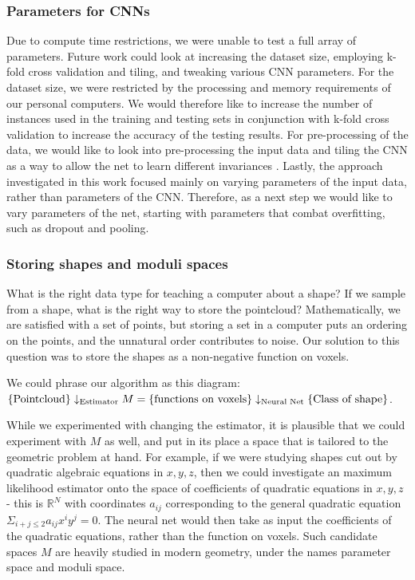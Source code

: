 \documentclass{article}
\begin{document}
\subsubsection{Parameters for CNNs}
Due to compute time restrictions, we were unable to test a full array of parameters.
Future work could look at increasing the dataset size, employing k-fold cross validation and tiling, and tweaking various CNN parameters. For the dataset size, we were restricted by the processing and memory requirements of our personal computers. We would therefore like to increase the number of instances used in the training and testing sets in conjunction with k-fold cross validation to increase the accuracy of the testing results. For pre-processing of the data, we would like to look into pre-processing the input data and tiling the CNN as a way to allow the net to learn different invariances \cite{Le10tiledconvolutional}. Lastly, the approach investigated in this work focused mainly on varying parameters of the input data, rather than parameters of the CNN. Therefore, as a next step we would like to vary parameters of the net, starting with parameters that combat overfitting, such as dropout and pooling.

\subsubsection{Storing shapes and moduli spaces}

What is the right data type for teaching a computer about a shape?
If we sample from a shape, what is the right way to store the pointcloud? Mathematically, we are satisfied with a set of points, but storing a set in a computer puts an ordering on the points, and the unnatural order contributes to noise.
Our solution to this question was to store the shapes as a non-negative function on voxels.

We could phrase our algorithm as this diagram: $\{\text{Pointcloud}\} \\ \downarrow_{\text{Estimator}} \\ M = \{\text{functions on voxels}\} \\ \downarrow_{\text{Neural Net}} \\ \{\text{Class of shape}\}$.

While we experimented with changing the estimator, it is plausible that we could experiment with $M$ as well, and put in its place a space that is tailored to the geometric problem at hand. For example, if we were studying shapes cut out by quadratic algebraic equations in $x,y,z$, then we could investigate an maximum likelihood estimator onto the space of coefficients of quadratic equations in $x,y,z$ - this is $\mathbb{R}^N$ with coordinates $a_{ij}$ corresponding to the general quadratic equation $\Sigma_{i + j \leq 2} a_{ij}x^iy^j = 0$. The neural net would then take as input the coefficients of the quadratic equations, rather than the function on voxels. Such candidate spaces $M$ are heavily studied in modern geometry, under the names parameter space and moduli space.
\end{document}

